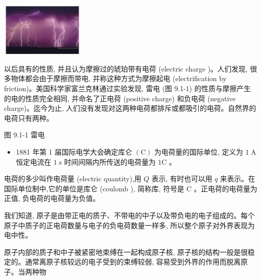 \documentclass[10pt]{article}
\begin{document}
\begin{mdframed}

\begin{center}
\includegraphics[max width=0.3\textwidth]{images/01911d5f-8e38-70c0-b5b8-2b399bd115b6_7_996169.jpg}
\end{center}

以后具有的性质, 并且认为摩擦过的琥珀带有电荷 (electric charge )。人们发现, 很多物体都会由于摩擦而带电, 并称这种方式为摩擦起电 (electrification by friction)。美国科学家富兰克林通过实验发现, 雷电 (图 9.1-1) 的性质与摩擦产生的电的性质完全相同, 并命名了正电荷 (positive charge) 和负电荷 (negative charge)。迄今为止, 人们没有发现对这两种电荷都排斥或都吸引的电荷。自然界的电荷只有两种。

图 9.1-1 雷电

\begin{itemize}
\item 1881 年第 1 届国际电学大会确定库仑 \(\left( \mathrm{C}\right)\) 为电荷量的国际单位, 定义为 \(1\mathrm{\;A}\) 恒定电流在 \(1\mathrm{\;s}\) 时间间隔内所传送的电荷量为 \(1\mathrm{C}\) 。
\end{itemize}

\end{mdframed}

电荷的多少叫作电荷量 (electric quantity),用 \(Q\) 表示, 有时也可以用 \(q\) 来表示。在国际单位制中,它的单位是库仑 (coulomb ), 简称库, 符号是 \(\mathrm{C}\) 。正电荷的电荷量为正值, 负电荷的电荷量为负值。

我们知道, 原子是由带正电的质子、不带电的中子以及带负电的电子组成的。每个原子中质子的正电荷数量与电子的负电荷数量一样多, 所以整个原子对外界表现为电中性。

原子内部的质子和中子被紧密地束缚在一起构成原子核, 原子核的结构一般是很稳定的。通常离原子核较远的电子受到的束缚较弱, 容易受到外界的作用而脱离原子。当两种物
\end{document}
